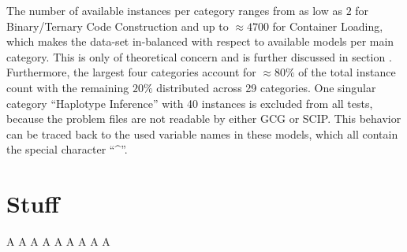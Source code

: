 		The number of available instances per category ranges from as low as $2$ for Binary/Ternary Code Construction and up to $\approx 4700$ for Container Loading, which makes the data-set in-balanced with respect to available models per main category. This is only of theoretical concern and is further discussed in section .
		Furthermore, the largest four categories account for $\approx 80\%$ of the total instance count with the remaining $20\%$ distributed across 29 categories.
		One singular category \enquote{Haplotype Inference} with 40 instances is excluded from all tests, because the problem files are not readable by either \acs{GCG} or \acs{SCIP}. This behavior can be traced back to the used variable names in these models, which all contain the special character \enquote{\^}.
	
	\section{Stuff}
		\clearpage
		A\clearpage
		A\clearpage
		A\clearpage
		A\clearpage
		A\clearpage
		A\clearpage
		A\clearpage
		A\clearpage
		A\clearpage